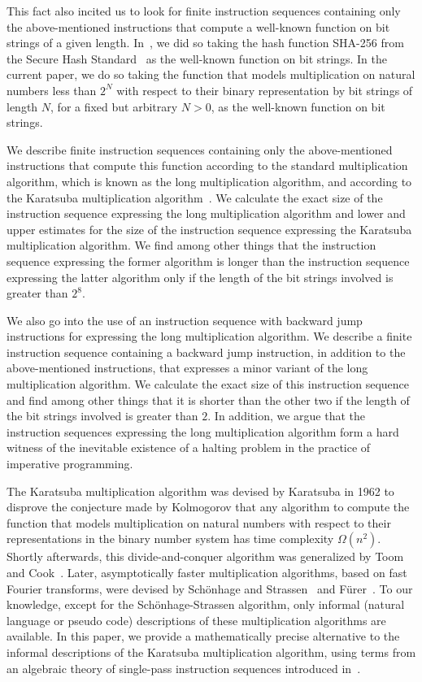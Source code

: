 \documentclass{llncs}
\begin{document}
This fact also incited us to look for finite instruction sequences 
containing only the above-mentioned instructions that compute a 
well-known function on bit strings of a given length.
In~\cite{BM13b}, we did so taking the hash function SHA-256 from the 
Secure Hash Standard~\cite{NIST12a} as the well-known function on bit 
strings.
In the current paper, we do so taking the function that models 
multiplication on natural numbers less than $2^N$ with respect to their 
binary representation by bit strings of length $N$, for a fixed but 
arbitrary $N > 0$, as the well-known function on bit strings.

We describe finite instruction sequences containing only the 
above-mentioned instructions that compute this function according to the 
standard multiplication algorithm, which is known as the long 
multiplication algorithm, and according to the Karatsuba multiplication 
algorithm~\cite{Kar95a,KO62a}.
We calculate the exact size of the instruction sequence expressing the 
long multiplication algorithm and lower and upper estimates for the size
of the instruction sequence expressing the Karatsuba multiplication 
algorithm.
We find among other things that the instruction sequence expressing the 
former algorithm is longer than the instruction sequence expressing the 
latter algorithm  only if the length of the bit strings involved is 
greater than $2^8$.

We also go into the use of an instruction sequence with backward jump 
instructions for expressing the long multiplication algorithm.
We describe a finite instruction sequence containing a backward jump 
instruction, in addition to the above-mentioned instructions, that 
expresses a minor variant of the long multiplication algorithm.
We calculate the exact size of this instruction sequence and find among 
other things that it is shorter than the other two if the length of the 
bit strings involved is greater than $2$.
In addition, we argue that the instruction sequences expressing the
long multiplication algorithm form a hard witness of the inevitable 
existence of a halting problem in the practice of impera\-tive
programming.

The Karatsuba multiplication algorithm was devised by Karatsuba in 1962 
to disprove the conjecture made by Kolmogorov that any algorithm to 
compute the function that models multiplication on natural numbers with
respect to their representations in the binary number system has time 
complexity $\Omega(n^2)$.
Shortly afterwards, this divide-and-conquer algorithm was generalized by 
Toom and Cook~\cite{Coo66a,Too63a}.
Later, asymptotically faster multiplication algorithms, based on fast 
Fourier transforms, were devised by Sch\"{o}nhage and 
Strassen~\cite{SS71a} and F\"{u}rer~\cite{Fur09a}.
To our knowledge, except for the Sch\"{o}nhage-Strassen algorithm, only 
informal (natural language or pseudo code) descriptions of these 
multiplication algorithms are available.
In this paper, we provide a mathematically precise alternative to the
informal descriptions of the Karatsuba multiplication algorithm, using
terms from an algebraic theory of single-pass instruction sequences
introduced in~\cite{BL02a}.
\end{document}
